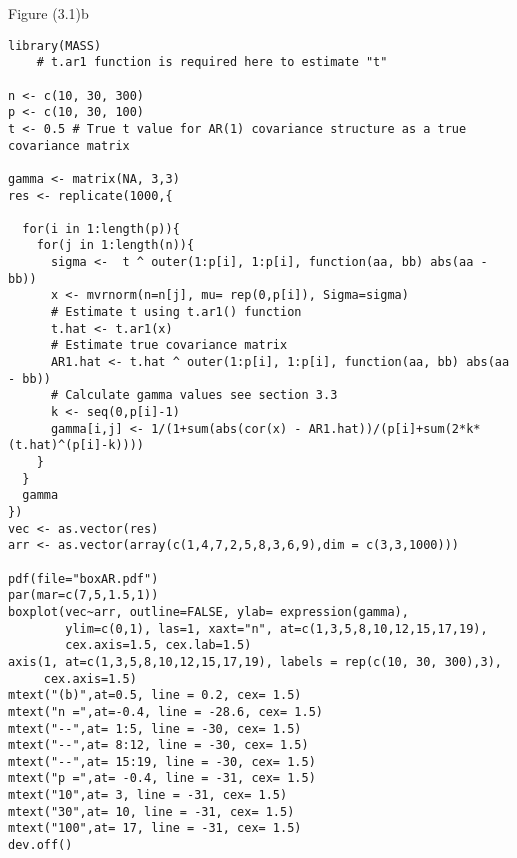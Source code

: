 Figure (3.1)b
\begin{lstlisting}
library(MASS) 
    # t.ar1 function is required here to estimate "t" 

n <- c(10, 30, 300)
p <- c(10, 30, 100)
t <- 0.5 # True t value for AR(1) covariance structure as a true covariance matrix

gamma <- matrix(NA, 3,3)
res <- replicate(1000,{
  
  for(i in 1:length(p)){
    for(j in 1:length(n)){
      sigma <-  t ^ outer(1:p[i], 1:p[i], function(aa, bb) abs(aa - bb))
      x <- mvrnorm(n=n[j], mu= rep(0,p[i]), Sigma=sigma)
      # Estimate t using t.ar1() function
      t.hat <- t.ar1(x)
      # Estimate true covariance matrix 
      AR1.hat <- t.hat ^ outer(1:p[i], 1:p[i], function(aa, bb) abs(aa - bb)) 
      # Calculate gamma values see section 3.3
      k <- seq(0,p[i]-1)
      gamma[i,j] <- 1/(1+sum(abs(cor(x) - AR1.hat))/(p[i]+sum(2*k*(t.hat)^(p[i]-k))))
    }
  }
  gamma
})
vec <- as.vector(res)
arr <- as.vector(array(c(1,4,7,2,5,8,3,6,9),dim = c(3,3,1000)))

pdf(file="boxAR.pdf")
par(mar=c(7,5,1.5,1))
boxplot(vec~arr, outline=FALSE, ylab= expression(gamma),
        ylim=c(0,1), las=1, xaxt="n", at=c(1,3,5,8,10,12,15,17,19),
        cex.axis=1.5, cex.lab=1.5)
axis(1, at=c(1,3,5,8,10,12,15,17,19), labels = rep(c(10, 30, 300),3),
     cex.axis=1.5)
mtext("(b)",at=0.5, line = 0.2, cex= 1.5)
mtext("n =",at=-0.4, line = -28.6, cex= 1.5)
mtext("--",at= 1:5, line = -30, cex= 1.5)
mtext("--",at= 8:12, line = -30, cex= 1.5)
mtext("--",at= 15:19, line = -30, cex= 1.5)
mtext("p =",at= -0.4, line = -31, cex= 1.5)
mtext("10",at= 3, line = -31, cex= 1.5)
mtext("30",at= 10, line = -31, cex= 1.5)
mtext("100",at= 17, line = -31, cex= 1.5)
dev.off()
\end{lstlisting}

